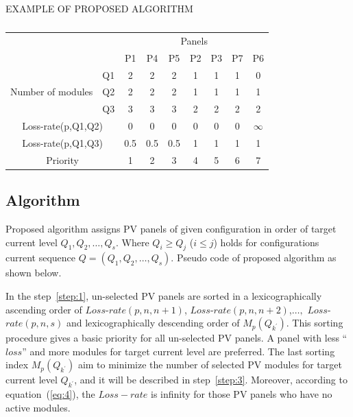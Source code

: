 \documentclass[journal]{IEEEtran}
\begin{document}
\begin{table}[htbp]
  \caption[]{\label{tab:exampleofalgo}}
  \centerline{EXAMPLE OF PROPOSED ALGORITHM}
  \vskip5pt
  \begin{tabular}{c|c|ccccccc}
  \hline
  \hline
\multicolumn{2}{c|}{\multirow{2}{*}{}}  & \multicolumn{7}{c}{Panels}                                                      \\ \cline{3-9} 
\multicolumn{2}{c|}{}                   & P1  & P4  & P5                       & P2 & P3 & P7                     & P6     \\ \hline
\multirow{3}{*}{Number of modules} & Q1 & 2   & 2   & 2                        & 1  & 1  & 1                      & 0      \\ \cline{2-2}
                                   & Q2 & 2   & 2   & 2                        & 1  & 1  & 1                      & 1      \\ \cline{2-2}
                                   & Q3 & 3   & 3   & 3                        & 2  & 2  & 2                      & 2      \\ \hline
\multicolumn{2}{c|}{Loss-rate(p,Q1,Q2)} & 0   & 0   & \multicolumn{1}{c|}{0}   & 0  & 0  & \multicolumn{1}{c|}{0} & $\infty$ \\ \cline{1-2}
\multicolumn{2}{c|}{Loss-rate(p,Q1,Q3)} & 0.5 & 0.5 & \multicolumn{1}{c|}{0.5} & 1  & 1  & \multicolumn{1}{c|}{1} & 1      \\ \hline
\multicolumn{2}{c|}{Priority}           & 1   & 2   & 3                        & 4  & 5  & 6                      & 7      \\ \hline
\end{tabular}
\end{table}
\subsection{Algorithm}\label{sec:algorithm}
Proposed algorithm assigns PV panels of given configuration in order of target current level $Q_{1}, Q_{2},\dots, Q_{s}$.
Where $Q_{i}\geq Q_{j}$ ($i \leq j$) holds for configurations current sequence $Q = (Q_{1},Q_{2},\dots,Q_{s})$.
Pseudo code of proposed algorithm as shown below.

In the step~\ref{step:1}, un-selected PV panels are sorted  in a lexicographically  ascending order of $Loss$-$rate(p,n,n+1)$, $Loss$-$rate(p,n,n+2)$,$\dots,$ $Loss$-$rate(p,n,s)$ and  lexicographically descending order of $M_{p}(Q_{k^{'}})$.
This sorting procedure gives a basic priority for all un-selected PV panels.
A panel with less ``$loss$'' and more modules for target current level are preferred.
The last sorting index $M_{p}(Q_{k^{'}})$ aim to minimize the number of selected PV modules for target current level $Q_{k^{'}}$, and it will be described in step~\ref{step:3}.
Moreover, according to equation~(\ref{eq:4}), the $Loss-rate$ is infinity for those PV panels who have no active modules.
\end{document}
